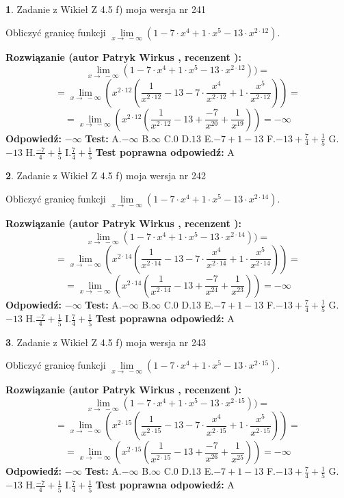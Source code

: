 \documentclass[12pt, a4paper]{article}
\theoremstyle{definition} %
\newtheorem{zad}{}
\newcommand{\zadStart}[1]{\begin{zad}#1\newline}
\newcommand{\zadStop}{\end{zad}}
\newcommand{\rozwStart}[2]{\noindent \textbf{Rozwiązanie (autor #1 , recenzent #2): }\newline}
\newcommand{\rozwStop}{\newline}
\newcommand{\odpStart}{\noindent \textbf{Odpowiedź:}\newline}
\newcommand{\odpStop}{\newline}
\newcommand{\testStart}{\noindent \textbf{Test:}\newline}
\newcommand{\testStop}{\newline}
\newcommand{\kluczStart}{\noindent \textbf{Test poprawna odpowiedź:}\newline}
\newcommand{\kluczStop}{\newline}
\begin{document}
\zadStart{Zadanie z Wikieł Z 4.5 f) moja wersja nr 241}



Obliczyć granicę funkcji  $\lim\limits_{x\to\ -\infty}(1 - 7 \cdot x^{4}+1 \cdot x^{5}- 13 \cdot x^{2\cdot12})$.
\zadStop
\rozwStart{Patryk Wirkus}{}
$$\lim\limits_{x\to\ -\infty}(1 - 7 \cdot x^{4}+1 \cdot x^{5}- 13 \cdot x^{2\cdot12}))=$$
$$=\lim\limits_{x\to\ -\infty}(x^{2\cdot12}(\frac{1}{x^{2\cdot12}}-13 -7 \cdot \frac{x^{4}}{x^{2\cdot12}}+1 \cdot \frac{x^{5}}{x^{2\cdot12}}))=$$
$$=\lim\limits_{x\to\ -\infty}(x^{2\cdot12}(\frac{1}{x^{2\cdot12}}-13 + \frac{-7}{x^{20}}+ \frac{1}{x^{19}}))=-\infty$$
\rozwStop
\odpStart
$-\infty$
\odpStop
\testStart
A.$-\infty$ B.$\infty$ C.$0$ D.$13$ E.$-7 + 1 - 13$
F.$-13+\frac{7}{4}+\frac{1}{5}$ G.$-13$
H.$\frac{-7}{4}+\frac{1}{5}$
I.$\frac{7}{4}+\frac{1}{5}$
\testStop
\kluczStart
A
\kluczStop



\zadStart{Zadanie z Wikieł Z 4.5 f) moja wersja nr 242}



Obliczyć granicę funkcji  $\lim\limits_{x\to\ -\infty}(1 - 7 \cdot x^{4}+1 \cdot x^{5}- 13 \cdot x^{2\cdot14})$.
\zadStop
\rozwStart{Patryk Wirkus}{}
$$\lim\limits_{x\to\ -\infty}(1 - 7 \cdot x^{4}+1 \cdot x^{5}- 13 \cdot x^{2\cdot14}))=$$
$$=\lim\limits_{x\to\ -\infty}(x^{2\cdot14}(\frac{1}{x^{2\cdot14}}-13 -7 \cdot \frac{x^{4}}{x^{2\cdot14}}+1 \cdot \frac{x^{5}}{x^{2\cdot14}}))=$$
$$=\lim\limits_{x\to\ -\infty}(x^{2\cdot14}(\frac{1}{x^{2\cdot14}}-13 + \frac{-7}{x^{24}}+ \frac{1}{x^{23}}))=-\infty$$
\rozwStop
\odpStart
$-\infty$
\odpStop
\testStart
A.$-\infty$ B.$\infty$ C.$0$ D.$13$ E.$-7 + 1 - 13$
F.$-13+\frac{7}{4}+\frac{1}{5}$ G.$-13$
H.$\frac{-7}{4}+\frac{1}{5}$
I.$\frac{7}{4}+\frac{1}{5}$
\testStop
\kluczStart
A
\kluczStop



\zadStart{Zadanie z Wikieł Z 4.5 f) moja wersja nr 243}



Obliczyć granicę funkcji  $\lim\limits_{x\to\ -\infty}(1 - 7 \cdot x^{4}+1 \cdot x^{5}- 13 \cdot x^{2\cdot15})$.
\zadStop
\rozwStart{Patryk Wirkus}{}
$$\lim\limits_{x\to\ -\infty}(1 - 7 \cdot x^{4}+1 \cdot x^{5}- 13 \cdot x^{2\cdot15}))=$$
$$=\lim\limits_{x\to\ -\infty}(x^{2\cdot15}(\frac{1}{x^{2\cdot15}}-13 -7 \cdot \frac{x^{4}}{x^{2\cdot15}}+1 \cdot \frac{x^{5}}{x^{2\cdot15}}))=$$
$$=\lim\limits_{x\to\ -\infty}(x^{2\cdot15}(\frac{1}{x^{2\cdot15}}-13 + \frac{-7}{x^{26}}+ \frac{1}{x^{25}}))=-\infty$$
\rozwStop
\odpStart
$-\infty$
\odpStop
\testStart
A.$-\infty$ B.$\infty$ C.$0$ D.$13$ E.$-7 + 1 - 13$
F.$-13+\frac{7}{4}+\frac{1}{5}$ G.$-13$
H.$\frac{-7}{4}+\frac{1}{5}$
I.$\frac{7}{4}+\frac{1}{5}$
\testStop
\kluczStart
A
\kluczStop
\end{document}
